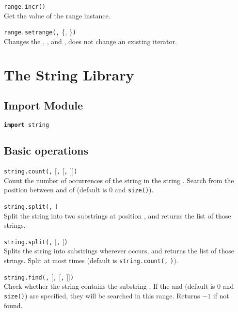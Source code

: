\hangpar \texttt{range.incr()}\\
Get the  value of the range instance.

\hangpar \texttt{range.setrange(}\texttt{,} \{, \}\texttt{)}\\
Changes the , , and , does not change an existing iterator.

\section*{The String Library}

\subsection*{Import Module}

\hangpar \texttt{\textbf{import} string}

\subsection*{Basic operations}

\hangpar \texttt{string.count(}\texttt{,} [\texttt{,} [\texttt{,} ]]\texttt{)}\\
Count the number of occurrences of the  string in the string . Search from the position between  and  of  (default is $0$ and \texttt{size(}\texttt{)}).

\hangpar \texttt{string.split(}\texttt{,} \texttt{)}\\
Split the string  into two substrings at position , and returns the list of those strings.

\hangpar \texttt{string.split(}\texttt{,} [\texttt{,} ]\texttt{)}\\
Splits the string  into substrings wherever  occurs, and returns the list of those strings. Split at most  times (default is \texttt{string.count(}\texttt{,} \texttt{)}).

\hangpar \texttt{string.find(}\texttt{,} [\texttt{,} [\texttt{,} ]]\texttt{)}\\
Check whether the string  contains the substring . If the  and  (default is $0$ and \texttt{size(}\texttt{)}) are specified, they will be searched in this range. Returns $-1$ if not found.

